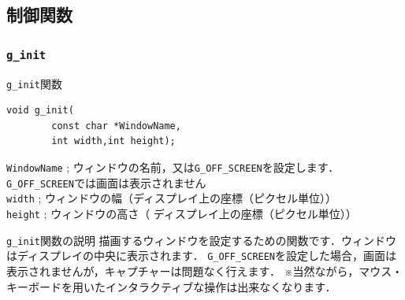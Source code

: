 \documentclass[a4paper,12pt]{jsarticle}%
\begin{document}


\clearpage
\subsection{制御関数}

\subsubsection{\texttt{g\_init}}

\begin{itembox}[l]{\texttt{g\_init}関数}
\begin{verbatim}
void g_init(
        const char *WindowName,
        int width,int height);
\end{verbatim}
\verb|WindowName| ; ウィンドウの名前，又は\verb|G_OFF_SCREEN|を設定します．\verb|G_OFF_SCREEN|では画面は表示されません\\
\verb|width| ; ウィンドウの幅（ディスプレイ上の座標（ピクセル単位））\\
\verb|height| ; ウィンドウの高さ（ ディスプレイ上の座標（ピクセル単位））
\end{itembox}

\begin{itembox}[l]{\texttt{g\_init}関数の説明}
描画するウィンドウを設定するための関数です．ウィンドウはディスプレイの中央に表示されます．
\verb|G_OFF_SCREEN|を設定した場合，画面は表示されませんが，キャプチャーは問題なく行えます．
※当然ながら，マウス・キーボードを用いたインタラクティブな操作は出来なくなります．
\end{itembox}


\clearpage
\end{document}
